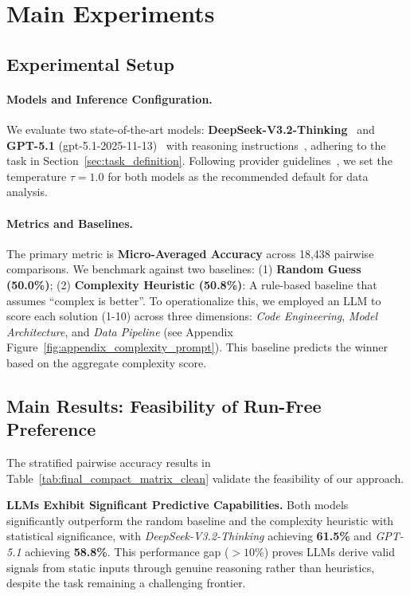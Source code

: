 \section{Main Experiments}
\label{sec:experiments}



\subsection{Experimental Setup}
\label{sec:setup}

\paragraph{Models and Inference Configuration.}
We evaluate two state-of-the-art models: \textbf{DeepSeek-V3.2-Thinking}~\cite{deepseekai2025deepseekv3technicalreport} and \textbf{GPT-5.1} (gpt-5.1-2025-11-13)~\cite{openai2025gpt5card} with reasoning instructions~\cite{wei2023chainofthoughtpromptingelicitsreasoning, kojima2023largelanguagemodelszeroshot}, adhering to the task in Section~\ref{sec:task_definition}.
Following provider guidelines~\cite{deepseek2024apidocs}, we set the temperature $\tau = 1.0$ for both models as the recommended default for data analysis.

\paragraph{Metrics and Baselines.}
The primary metric is \textbf{Micro-Averaged Accuracy} across 18,438 pairwise comparisons.
We benchmark against two baselines:
(1) \textbf{Random Guess (50.0\%)};
(2) \textbf{Complexity Heuristic (50.8\%)}: A rule-based baseline that assumes ``complex is better''.
To operationalize this, we employed an LLM to score each solution (1-10) across three dimensions: \textit{Code Engineering}, \textit{Model Architecture}, and \textit{Data Pipeline} (see Appendix Figure~\ref{fig:appendix_complexity_prompt}).
This baseline predicts the winner based on the aggregate complexity score.


\subsection{Main Results: Feasibility of Run-Free Preference}
\label{sec:main_results}

The stratified pairwise accuracy results in Table~\ref{tab:final_compact_matrix_clean} validate the feasibility of our approach.

\textbf{LLMs Exhibit Significant Predictive Capabilities.}
Both models significantly outperform the random baseline and the complexity heuristic with statistical significance, with \textit{DeepSeek-V3.2-Thinking} achieving \textbf{61.5\%} and \textit{GPT-5.1} achieving \textbf{58.8\%}.
This performance gap ($>10\%$) proves LLMs derive valid signals from static inputs through genuine reasoning rather than heuristics, despite the task remaining a challenging frontier.
